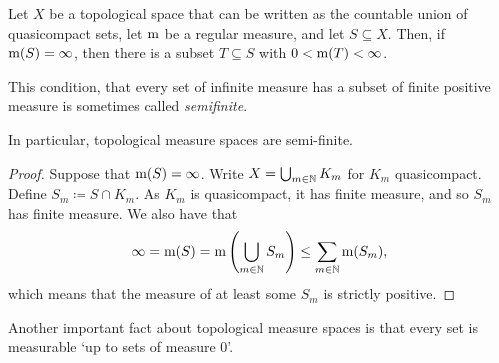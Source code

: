 \begin{prp}\label{Semifinite}
Let $X$ be a topological space that can be written as the countable union of quasicompact sets, let $\mathrm{m}$ be a regular measure, and let $S\subseteq X$.  Then, if $\mathrm{m} (S)=\infty$, then there is a subset $T\subseteq S$ with $0<\mathrm{m} (T)<\infty$.
\begin{rmk}
This condition, that every set of infinite measure has a subset of finite positive measure is sometimes called \emph{semifinite}.
\end{rmk}
\begin{rmk}
In particular, topological measure spaces are semi-finite.
\end{rmk}
\begin{proof}
Suppose that $\mathrm{m} (S)=\infty$.  Write $X=\bigcup _{m\in \mathbb{N}}K_m$ for $K_m$ quasicompact.  Define $S_m\coloneqq S\cap K_m$.  As $K_m$ is quasicompact, it has finite measure, and so $S_m$ has finite measure.  We also have that
\begin{equation}
\infty =\mathrm{m} (S)=\mathrm{m} \left( \bigcup _{m\in \mathbb{N}}S_m\right) \leq \sum _{m\in \mathbb{N}}\mathrm{m} (S_m),
\end{equation}
which means that the measure of at least some $S_m$ is strictly positive.
\end{proof}
\end{prp}
Another important fact about topological measure spaces is that every set is measurable `up to sets of measure $0$'.
